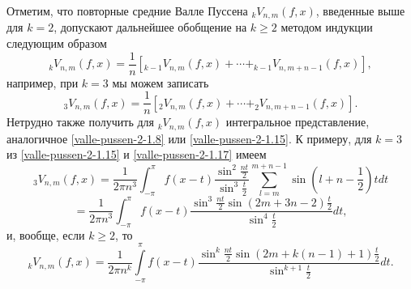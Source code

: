  Отметим, что повторные средние Валле Пуссена $_kV_{n,m}(f,x)$, введенные выше для $k=2$, допускают дальнейшее обобщение на $k\ge2$    методом индукции следующим образом
\begin{equation}\label{valle-pussen-2-1.16}
  {}_{k}V_{n,m}(f,x)=\frac1{n}[ _{k-1}V_{n,m}(f,x)+\cdots+ _{k-1}V_{n,m+n-1}(f,x)],
\end{equation}
например, при $k=3$ мы можем записать
\begin{equation}\label{valle-pussen-2-1.17}
  _3V_{n,m}(f,x)=\frac1{n}[ _2V_{n,m}(f,x)+\cdots+ _2V_{n,m+n-1}(f,x)].
\end{equation}
Нетрудно также получить для $_kV_{n,m}(f,x)$ интегральное представление, аналогичное \eqref{valle-pussen-2-1.8} или \eqref{valle-pussen-2-1.15}. К примеру, для $k=3$ из \eqref{valle-pussen-2-1.15} и \eqref{valle-pussen-2-1.17} имеем
$$
 _3V_{n,m}(f,x)=\frac{1}{2\pi n^3}\int_{-\pi}^\pi f(x-t) \frac{\sin^2\frac{nt}{2}}{\sin^3\frac{t}{2}}\sum_{l=m}^{m+n-1}\sin(l+n-\frac12)tdt
$$
  \begin{equation}\label{valle-pussen-2-1.18}
= \frac{1}{2\pi n^3}\int_{-\pi}^\pi f(x-t) \frac{\sin^3\frac{nt}{2}\sin(2m+3n-2)\frac{t}{2}}{\sin^4\frac{t}{2}}dt,
  \end{equation}
и, вообще, если $k\ge2$, то
 \begin{equation}\label{valle-pussen-2-1.19}
_kV_{n,m}(f,x)= \frac{1}{2\pi n^k}\int\limits_{-\pi}^\pi f(x-t) \frac{\sin^k\frac{nt}{2}\sin(2m+k(n-1)+1)\frac{t}{2}}{\sin^{k+1}\frac{t}{2}}dt.
  \end{equation}






